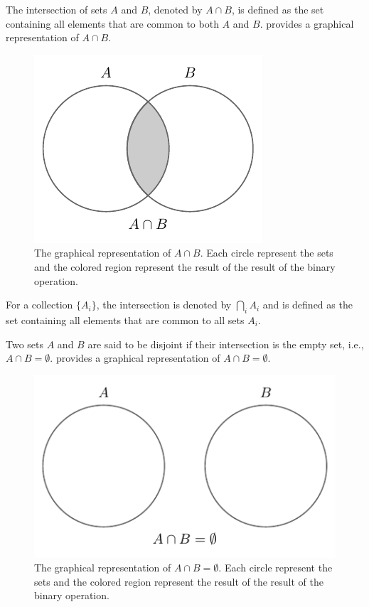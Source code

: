 \begin{definition}[Intersection]
	The intersection of sets $A$ and $B$, denoted by $A \cap B$, is defined as the set containing all elements that are common to both $A$ and $B$.  provides a graphical representation of $A \cap B$.
	\begin{figure}[H]
		\centering
		\includegraphics[]{figures/set_intersection.pdf}
		\caption{The graphical representation of $A\cap B$. Each circle represent the sets and the colored region represent the result of the result of the binary operation.}
		\label{fig:set_intersection}
	\end{figure}
\end{definition}

\begin{definition}
	For a collection $\{A_i\}$, the intersection is denoted by $\bigcap_{i} A_i$ and is defined as the set containing all elements that are common to all sets $A_i$.
\end{definition}

\begin{definition}[Disjoint]
	Two sets $A$ and $B$ are said to be disjoint if their intersection is the empty set, i.e., $A \cap B = \emptyset$.  provides a graphical representation of $A \cap B=\emptyset$.
	\begin{figure}[H]
		\centering
		\includegraphics[]{figures/set_disjoint.pdf}
		\caption{The graphical representation of $A\cap B= \emptyset$. Each circle represent the sets and the colored region represent the result of the result of the binary operation.}
		\label{fig:set_disjoint}
	\end{figure}
\end{definition}


